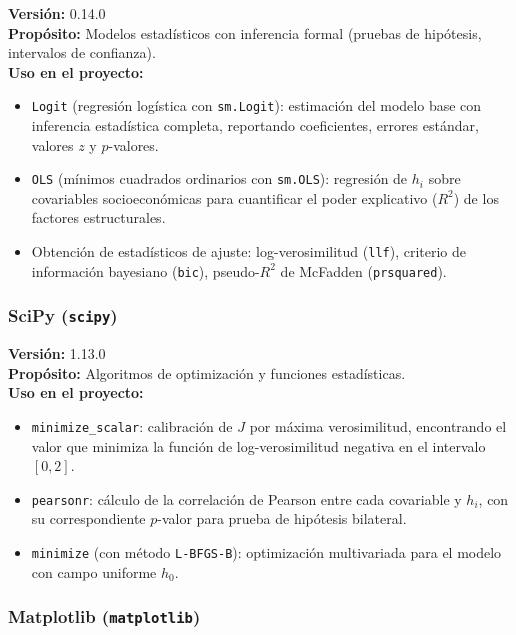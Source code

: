\documentclass[12pt,a4paper]{article}
\begin{document}
\textbf{Versión:} 0.14.0\\
\textbf{Propósito:} Modelos estadísticos con inferencia formal (pruebas de hipótesis, intervalos de confianza).\\
\textbf{Uso en el proyecto:}
\begin{itemize}
    \item \texttt{Logit} (regresión logística con \texttt{sm.Logit}): estimación del modelo base con inferencia estadística completa, reportando coeficientes, errores estándar, valores $z$ y $p$-valores.
    \item \texttt{OLS} (mínimos cuadrados ordinarios con \texttt{sm.OLS}): regresión de $h_i$ sobre covariables socioeconómicas para cuantificar el poder explicativo ($R^2$) de los factores estructurales.
    \item Obtención de estadísticos de ajuste: log-verosimilitud (\texttt{llf}), criterio de información bayesiano (\texttt{bic}), pseudo-$R^2$ de McFadden (\texttt{prsquared}).
\end{itemize}

\subsubsection{SciPy (\texttt{scipy})}

\textbf{Versión:} 1.13.0\\
\textbf{Propósito:} Algoritmos de optimización y funciones estadísticas.\\
\textbf{Uso en el proyecto:}
\begin{itemize}
    \item \texttt{minimize\_scalar}: calibración de $J$ por máxima verosimilitud, encontrando el valor que minimiza la función de log-verosimilitud negativa en el intervalo $[0, 2]$.
    \item \texttt{pearsonr}: cálculo de la correlación de Pearson entre cada covariable y $h_i$, con su correspondiente $p$-valor para prueba de hipótesis bilateral.
    \item \texttt{minimize} (con método \texttt{L-BFGS-B}): optimización multivariada para el modelo con campo uniforme $h_0$.
\end{itemize}

\subsubsection{Matplotlib (\texttt{matplotlib})}
\end{document}
